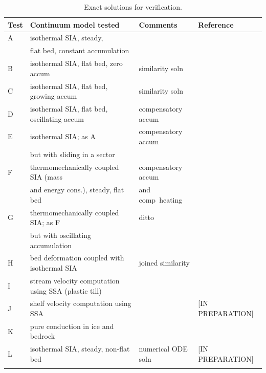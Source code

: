 \documentclass[11pt,final]{amsart}
\begin{document}
\begin{table}[ht]
\caption{Exact solutions for verification.}\label{tab:tests}
\small
\begin{tabular}{@{}llll}\hline
\textbf{Test} & \textbf{Continuum model tested} & \textbf{Comments} & \textbf{Reference} \\ \hline
A & isothermal SIA, steady, &  & \cite{BLKCB} \\
 & flat bed, constant accumulation &  &  \\
B & isothermal SIA, flat bed, zero accum & similarity soln & \cite{BLKCB,Halfar83} \\
C & isothermal SIA, flat bed, growing accum & similarity soln & \cite{BLKCB} \\
D & isothermal SIA, flat bed, oscillating accum & compensatory accum & \cite{BLKCB} \\
E & isothermal SIA; as A &  compensatory accum & \cite{BLKCB} \\
 & but with sliding in a sector &  &  \\
F & thermomechanically coupled SIA (mass &  compensatory accum & \cite{BB,BBL} \\
 & and energy cons.), steady, flat bed & and comp~heating &  \\
G & thermomechanically coupled SIA; as F  & ditto & \cite{BB,BBL} \\
 & but with oscillating accumulation &  &  \\
H & bed deformation coupled with isothermal SIA & joined similarity & \cite{BLKfastearth} \\
I & stream velocity computation using SSA (plastic till) &  & \cite{SchoofStream} \\
J & shelf velocity computation using SSA  &  & [IN PREPARATION] \\
K & pure conduction in ice and bedrock & & \cite{BuelerTestK} \\
L & isothermal SIA, steady, non-flat bed & numerical ODE soln & [IN PREPARATION] \\
\hline
\normalsize
\end{tabular}
\end{table}
\end{document}
